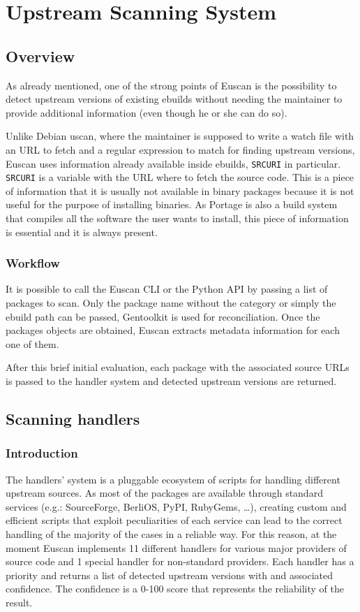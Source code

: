 \chapter{Upstream Scanning System}

\section{Overview}
As already mentioned, one of the strong points of Euscan is the possibility to detect upstream versions of existing ebuilds without needing the maintainer to provide additional information (even though he or she can do so).

Unlike Debian uscan, where the maintainer is supposed to write a watch file with an URL to fetch and a regular expression to match for finding upstream versions, Euscan uses information already available inside ebuilds, \texttt{SRC\textunderscore URI} in particular. \texttt{SRC\textunderscore URI} is a variable with the URL where to fetch the source code. This is a piece of information that it is usually not available in binary packages because it is not useful for the purpose of installing binaries. As Portage is also a build system that compiles all the software the user wants to install, this piece of information is essential and it is always present.

\subsection{Workflow}
It is possible to call the Euscan CLI or the Python API by passing a list of packages to scan. Only the package name without the category or simply the ebuild path can be passed, Gentoolkit is used for reconciliation. Once the packages objects are obtained, Euscan extracts metadata information for each one of them.

After this brief initial evaluation, each package with the associated source URLs is passed to the handler system and detected upstream versions are returned.


\section{Scanning handlers}
\label{sec:handlers}

\subsection{Introduction}
The handlers' system is a pluggable ecosystem of scripts for handling different upstream sources. As most of the packages are available through standard services (e.g.: SourceForge, BerliOS, PyPI, RubyGems, \ldots), creating custom and efficient scripts that exploit peculiarities of each service can lead to the correct handling of the majority of the cases in a reliable way. For this reason, at the moment Euscan implements 11 different handlers for various major providers of source code and 1 special handler for non-standard providers.
Each handler has a priority and returns a list of detected upstream versions with and associated confidence. The confidence is a 0-100 score that represents the reliability of the result.

